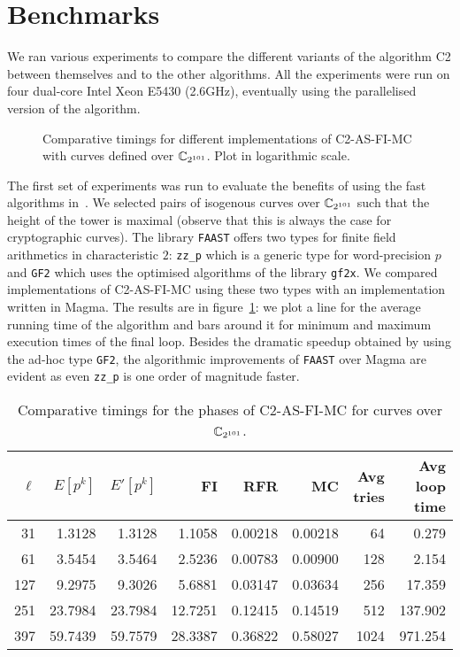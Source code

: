 \section{Benchmarks}
\label{sec:benchmarks}
We ran various experiments to compare the different variants of the
algorithm C2 between themselves and to the other algorithms. All the
experiments were run on four dual-core Intel Xeon E5430 (2.6GHz),
eventually using the parallelised version of the algorithm.

\begin{figure}
  \centering
  \caption{Comparative timings for different implementations of C2-AS-FI-MC with curves defined over $\mathbb{C}_{2^{101}}$. Plot in logarithmic scale.}
  \label{fig:2-101}
\end{figure}

The first set of experiments was run to evaluate the benefits of using
the fast algorithms in~\cite{DFS09}. We selected pairs of isogenous
curves over $\mathbb{C}_{2^{101}}$ such that the height of the tower is
maximal (observe that this is always the case for cryptographic
curves). The library \texttt{FAAST} offers two types for finite field
arithmetics in characteristic $2$: \texttt{zz\_p} which is a generic
type for word-precision $p$ and \texttt{GF2} which uses the optimised
algorithms of the library \texttt{gf2x}. We compared implementations
of C2-AS-FI-MC using these two types with an implementation written in
Magma. The results are in figure~\ref{fig:2-101}: we plot a line for
the average running time of the algorithm and bars around it for
minimum and maximum execution times of the final loop. Besides the
dramatic speedup obtained by using the ad-hoc type \texttt{GF2}, the
algorithmic improvements of \texttt{FAAST} over Magma are evident as
even \texttt{zz\_p} is one order of magnitude faster.

\begin{table}
  \centering
  \begin{tabular}{r r r r r r r r}
    \hline
    $\ell$ & $E[p^k]$ & $E'[p^k]$ & FI & RFR & MC & Avg tries & Avg loop time\\
    \hline
    31 & 1.3128 & 1.3128 & 1.1058 & 0.00218 & 0.00218 & 64 & 0.279\\
    61 & 3.5454 & 3.5464 & 2.5236 & 0.00783 & 0.00900 & 128 & 2.154 \\
    127 & 9.2975 & 9.3026 & 5.6881 & 0.03147 & 0.03634 & 256 & 17.359 \\
    251	& 23.7984 & 23.7984 & 12.7251 & 0.12415 & 0.14519 & 512 & 137.902 \\
    397 & 59.7439 & 59.7579 & 28.3387 & 0.36822 & 0.58027 & 1024 & 971.254 \\
    \hline
  \end{tabular}
  \caption{Comparative timings for the phases of C2-AS-FI-MC for curves over $\mathbb{C}_{2^{101}}$.}
  \label{tab:C2}
\end{table}

